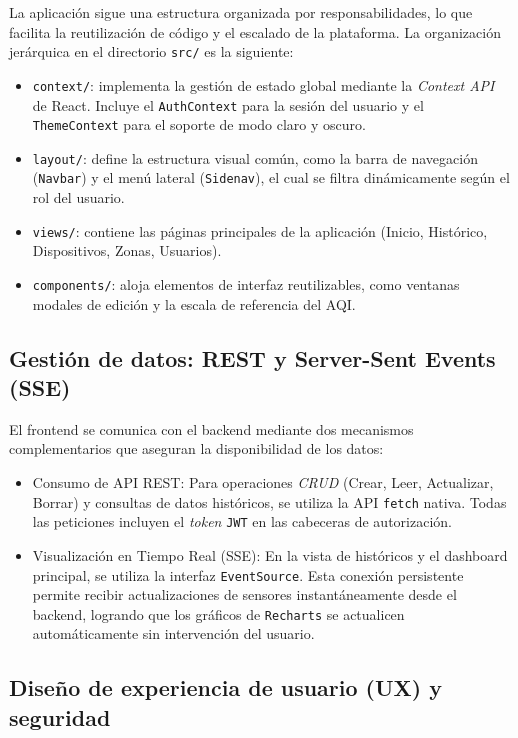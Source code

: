 La aplicación sigue una estructura organizada por responsabilidades, lo que facilita la reutilización de código y el escalado de la plataforma. La organización jerárquica en el directorio \texttt{src/} es la siguiente:

\begin{itemize}
    \item \texttt{context/}: implementa la gestión de estado global mediante la \textit{Context API} de React. Incluye el \texttt{AuthContext} para la sesión del usuario y el \texttt{ThemeContext} para el soporte de modo claro y oscuro.
    \item \texttt{layout/}: define la estructura visual común, como la barra de navegación (\texttt{Navbar}) y el menú lateral (\texttt{Sidenav}), el cual se filtra dinámicamente según el rol del usuario.
    \item \texttt{views/}: contiene las páginas principales de la aplicación (Inicio, Histórico, Dispositivos, Zonas, Usuarios).
    \item \texttt{components/}: aloja elementos de interfaz reutilizables, como ventanas modales de edición y la escala de referencia del AQI.
\end{itemize}

\subsection{Gestión de datos: REST y Server-Sent Events (SSE)}

El frontend se comunica con el backend mediante dos mecanismos complementarios que aseguran la disponibilidad de los datos:

\begin{itemize}
    \item Consumo de API REST: Para operaciones \textit{CRUD} (Crear, Leer, Actualizar, Borrar) y consultas de datos históricos, se utiliza la API \texttt{fetch} nativa. Todas las peticiones incluyen el \textit{token} \texttt{JWT} en las cabeceras de autorización.
    \item Visualización en Tiempo Real (SSE): En la vista de históricos y el dashboard principal, se utiliza la interfaz \texttt{EventSource}. Esta conexión persistente permite recibir actualizaciones de sensores instantáneamente desde el backend, logrando que los gráficos de \texttt{Recharts} se actualicen automáticamente sin intervención del usuario.
\end{itemize}

\subsection{Diseño de experiencia de usuario (UX) y seguridad}

